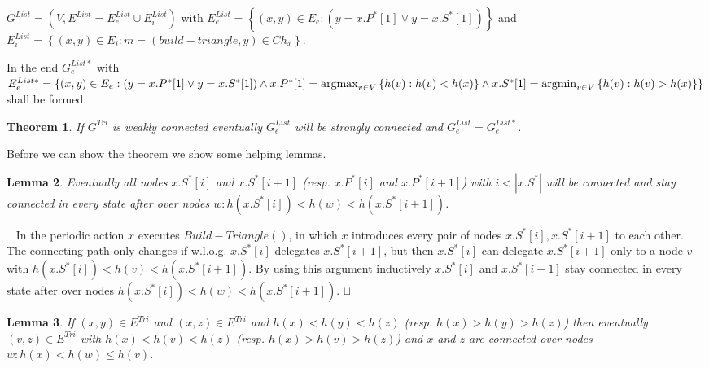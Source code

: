 \documentclass[11pt]{article}
\newtheorem{theorem}{Theorem}[section]
\newtheorem{lemma}[theorem]{Lemma}
\newcommand{\sq}{\hbox{\rlap{$\sqcap$}$\sqcup$}}
\newcommand{\qed}{\hspace*{\fill}\sq}
\newenvironment{proof}{\noindent {\bf Proof.}\ }{\qed\par\vskip 4mm\par}
\def\argmin{{\rm argmin}}
\def\argmax{{\rm argmax}}
\begin{document}
$G^{List}=(V,E^{List}=E^{List}_e \cup E^{List}_i)$ with $E^{List}_e=\left\{(x,y)\in E_e:(y=x.P^*[1] \vee y=x.S^*[1])\right\}$ and $E^{List}_i=\left\{(x,y)\in E_i:m=(build-triangle,y)\in Ch_x\right\}$.

In the end $G^{List*}_e$ with $E^{List*}_e=\{(x,y)\in E_e:(y=x.P^*[1]\- \vee y=x.S^*[1]) \wedge x.P^*[1]= \argmax_{ v \in V} \left\{h(v) : h(v)<h(x) \right\}
\wedge x.S^*[1]=\-\argmin_{ v \in V} \left\{h(v) : h(v)>h(x)\right\}\}$ shall be formed.

\begin{theorem}\label{theo:phase2}
If $G^{Tri}$ is weakly connected eventually $G^{List}_e$ will be strongly connected and $G^{List}_e=G^{List*}_e$.
\end{theorem}
 
Before we can show the theorem we show some helping lemmas.


\begin{lemma}\label{lem:RConnectivity}
Eventually all nodes $x.S^*[i]$ and $x.S^*[i+1]$ (resp. $x.P^*[i]$ and $x.P^*[i+1]$) with $i<|x.S^*|$ will be connected and stay connected in every state after over nodes $w: h(x.S^*[i])<h(w)<h(x.S^*[i+1])$.
\end{lemma}

\begin{proof}
In the periodic action $x$ executes $Build-Triangle()$, in which $x$ introduces every pair of nodes $x.S^*[i],x.S^*[i+1]$ to each other. The connecting path only changes if w.l.o.g. $x.S^*[i]$ delegates $x.S^*[i+1]$, but then $x.S^*[i]$ can delegate $x.S^*[i+1]$ only to a node $v$ with $h(x.S^*[i])<h(v)<h(x.S^*[i+1])$. By using this argument inductively $x.S^*[i]$ and $x.S^*[i+1]$ stay connected in every state after over nodes $h(x.S^*[i])<h(w)<h(x.S^*[i+1])$.
\end{proof}

\begin{lemma}\label{lem:Forward}
If $(x,y) \in E^{Tri}$ and $(x,z) \in E^{Tri}$ and $h(x)<h(y)<h(z)$ (resp. $h(x)>h(y)>h(z)$) then eventually $(v,z)\in E^{Tri}$ with $h(x)<h(v)<h(z)$ (resp. $h(x)>h(v)>h(z)$) and $x$ and $z$ are connected over nodes $w : h(x)<h(w)\leq h(v)$.
\end{lemma}
\end{document}
